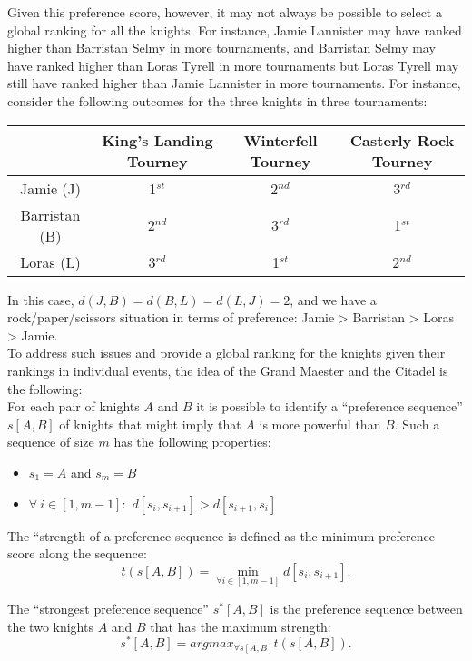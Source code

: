 \documentclass{article}
\begin{document}
\noindent Given this preference score, however, it may not always be
possible to select a global ranking for all the knights. For instance,
Jamie Lannister may have ranked higher than Barristan Selmy in more
tournaments, and Barristan Selmy may have ranked higher than Loras
Tyrell in more tournaments but Loras Tyrell may still have ranked
higher than Jamie Lannister in more tournaments. For instance,
consider the following outcomes for the three knights in three
tournaments:

\begin{center}
\begin{tabular}{|c|c|c|c|}
\hline
& King's Landing Tourney  & Winterfell Tourney  & Casterly Rock
Tourney\\
\hline
Jamie (J) & 1$^{st}$ & 2$^{nd}$ & 3$^{rd}$\\
Barristan (B) & 2$^{nd}$ & 3$^{rd}$ & 1$^{st}$\\
Loras (L) & 3$^{rd}$ & 1$^{st}$ & 2$^{nd}$\\
\hline
\end{tabular}
\end{center}

\noindent In this case, $d(J,B) = d(B,L) = d(L,J) = 2$, and we have a
rock/paper/scissors situation in terms of preference: Jamie >
Barristan > Loras > Jamie. \\

\noindent To address such issues and provide a global ranking for the
knights given their rankings in individual events, the idea of the
Grand Maester and the Citadel is the following:\\

\noindent For each pair of knights $A$ and $B$ it is possible to
identify a ``preference sequence'' $s[A,B]$ of knights that might
imply that $A$ is more powerful than $B$. Such a sequence of size $m$
has the following properties:
\begin{itemize}
\item $s_1 = A$ and $s_m = B$
\item $\forall\ i \in [1,m-1]:$ $d[s_i,s_{i+1}] > d[s_{i+1},s_i]$
\end{itemize}
\noindent The ``strength of a preference sequence is defined as the
minimum preference score along the sequence: $$ t( s[A,B] ) =
\min_{\forall i \in [1,m-1]} d[s_i,s_{i+1}].$$ 

\noindent The ``strongest preference sequence'' $s^*[A,B]$ is the
preference sequence between the two knights $A$ and $B$ that has the
maximum strength:
$$s^*[A,B] = argmax_{\forall s[A,B]} t( s[A,B] ).$$ 
\end{document}
